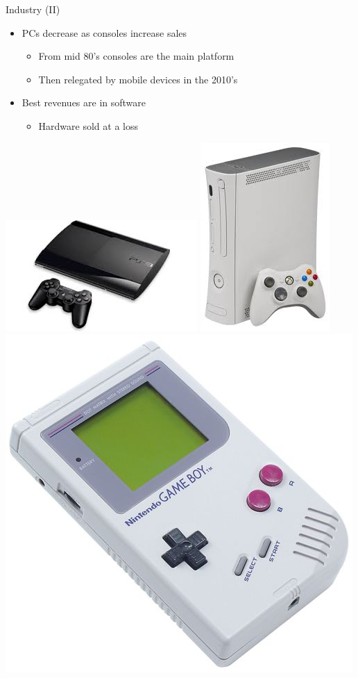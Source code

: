 \documentclass[10pt,compress]{beamer} %
\begin{document}
\begin{frame}{Industry (II)}
	\begin{itemize}
		\item PCs decrease as consoles increase sales
	    \begin{itemize}
		    \item From mid 80's consoles are the main platform
            \item Then relegated by mobile devices in the 2010's
	    \end{itemize}

		\item Best revenues are in software
		\begin{itemize}
		\item Hardware sold at a loss
		\end{itemize}
	\end{itemize}

	\begin{center}
	\includegraphics[width=0.3\linewidth]{figs/ps3.jpeg}
	\includegraphics[width=0.15\linewidth]{figs/xbox.jpeg}
	\includegraphics[width=0.2\linewidth]{figs/gameboy}
	\end{center}
\end{frame}
\end{document}
